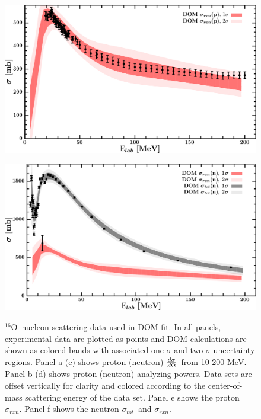 \documentclass[twocolumn,secnumarabic,amssymb, nobibnotes, aps, prl,
superscriptaddress, nobalancelastpage]{revtex4}
\newcommand{\tot}{\ensuremath{\sigma_{tot}}}
\newcommand{\rxn}{\ensuremath{\sigma_{rxn}}}
\newcommand{\el}{\ensuremath{\frac{\lowercase{d}\sigma}{\lowercase{d}\Omega}}}
\newcommand{\oSix}{\ensuremath{^{16}}O}
\begin{document}
\begin{figure}[!htb]
\begin{minipage}{0.45\textwidth}
        \label{DOM_o16_neutron_elastic}
    \end{minipage}
    \centering
    \begin{minipage}{0.45\textwidth}
        \centering
        \includegraphics[width=\textwidth]{figures/o16_protonInelastic.png}
        \label{DOM_o16_proton_inelastic}
    \end{minipage}\hspace{6pt}
    \begin{minipage}{0.45\textwidth}
        \centering
        \includegraphics[width=\textwidth]{figures/o16_neutronInelastic.png}
        \label{DOM_o16_neutron_inelastic}
    \end{minipage}
    \caption{\oSix\ nucleon scattering data used in DOM fit. In all panels, experimental data
    are plotted as points and DOM calculations are shown as colored bands with
    associated one-$\sigma$ and two-$\sigma$ uncertainty regions. Panel a (c)
    shows proton (neutron) \el\ from 10-200 MeV. Panel b (d) shows proton
    (neutron) analyzing powers. Data sets are offset vertically for clarity
    and colored according to the center-of-mass scattering energy of the data
    set. Panel e shows the proton \rxn. Panel f shows the neutron \tot\ and
\rxn.}
    \label{DOM_o16_scattering}
\end{figure}
\end{document}
